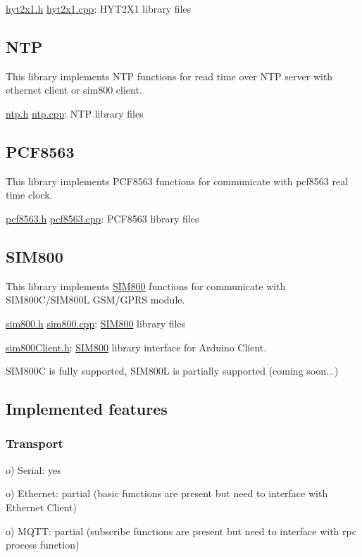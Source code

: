 \hyperlink{hyt2x1_8h}{hyt2x1.\+h} \hyperlink{hyt2x1_8cpp}{hyt2x1.\+cpp}\+: H\+Y\+T2\+X1 library files\hypertarget{index_ntp}{}\subsection{N\+TP}\label{index_ntp}
This library implements N\+TP functions for read time over N\+TP server with ethernet client or sim800 client.

\hyperlink{ntp_8h}{ntp.\+h} \hyperlink{ntp_8cpp}{ntp.\+cpp}\+: N\+TP library files\hypertarget{index_pcf8563}{}\subsection{P\+C\+F8563}\label{index_pcf8563}
This library implements P\+C\+F8563 functions for communicate with pcf8563 real time clock.

\hyperlink{pcf8563_8h}{pcf8563.\+h} \hyperlink{pcf8563_8cpp}{pcf8563.\+cpp}\+: P\+C\+F8563 library files\hypertarget{index_sim800}{}\subsection{S\+I\+M800}\label{index_sim800}
This library implements \hyperlink{classSIM800}{S\+I\+M800} functions for communicate with S\+I\+M800\+C/\+S\+I\+M800L G\+S\+M/\+G\+P\+RS module.

\hyperlink{sim800_8h}{sim800.\+h} \hyperlink{sim800_8cpp}{sim800.\+cpp}\+: \hyperlink{classSIM800}{S\+I\+M800} library files

\hyperlink{sim800Client_8h}{sim800\+Client.\+h}\+: \hyperlink{classSIM800}{S\+I\+M800} library interface for Arduino Client.

S\+I\+M800C is fully supported, S\+I\+M800L is partially supported (coming soon...)\hypertarget{index_implemented}{}\subsection{Implemented features}\label{index_implemented}
\hypertarget{index_transport}{}\subsubsection{Transport}\label{index_transport}
o) Serial\+: yes

o) Ethernet\+: partial (basic functions are present but need to interface with Ethernet Client)

o) M\+Q\+TT\+: partial (subscribe functions are present but need to interface with rpc process function)

